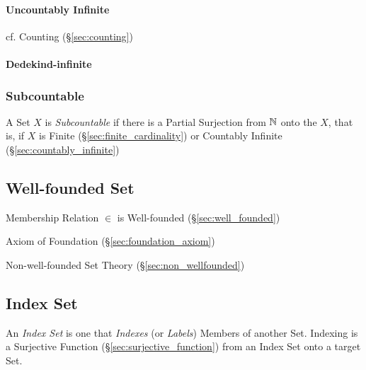 \paragraph{Uncountably Infinite}\label{sec:uncountably_infinite}\hfill

\fist cf. Counting (\S\ref{sec:counting})



\paragraph{Dedekind-infinite}\label{sec:dedekind_infinite}\hfill



\subsubsection{Subcountable}\label{sec:subcountable}

A Set $X$ is \emph{Subcountable} if there is a Partial Surjection from
$\mathbb{N}$ onto the $X$, that is, if $X$ is Finite
(\S\ref{sec:finite_cardinality}) or Countably Infinite
(\S\ref{sec:countably_infinite})



\subsection{Well-founded Set}\label{sec:wellfounded_set}

Membership Relation $\in$ is Well-founded (\S\ref{sec:well_founded})

Axiom of Foundation (\S\ref{sec:foundation_axiom})

Non-well-founded Set Theory (\S\ref{sec:non_wellfounded})



\subsection{Index Set}\label{sec:index_set}

An \emph{Index Set} is one that \emph{Indexes} (or \emph{Labels})
Members of another Set. Indexing is a Surjective Function
(\S\ref{sec:surjective_function}) from an Index Set onto a target Set.

